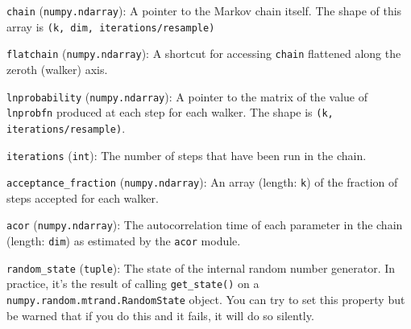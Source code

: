 \documentclass[12pt,preprint]{aastex}
\newlength{\argmarg}
\newcommand{\code}[1]{\texttt{#1}}
\newcommand{\param}[3]{{\item {\code{#1}} {\footnotesize (\code{#2})}: #3}}
\newcommand{\property}[3]{\param{#1}{#2}{#3}}
\newenvironment{arglist}[1]{\noindent\hspace{0.5\argmarg}{\bf {#1}}
    \begin{list}{}{
        \setlength{\leftmargin}{\argmarg}
    }}
    {\end{list}}
\newenvironment{properties}{\begin{arglist}{Properties}}{\end{arglist}}
\begin{document}
\begin{properties}
    \property{chain}{numpy.ndarray}{A pointer to the Markov chain itself. The
        shape of this array is \code{(k, dim, iterations/resample)}}
    \property{flatchain}{numpy.ndarray}{A shortcut for accessing \code{chain}
        flattened along the zeroth (walker) axis.}
    \property{lnprobability}{numpy.ndarray}{A pointer to the matrix of the
        value of \code{lnprobfn} produced at each step for each walker. The
        shape is \code{(k, iterations/resample)}.}
    \property{iterations}{int}{The number of steps that have been run in the
        chain.}
    \property{acceptance\_fraction}{numpy.ndarray}{An array (length: \code{k})
        of the fraction of steps accepted for each walker.}
    \property{acor}{numpy.ndarray}{The autocorrelation time of each parameter
        in the chain (length: \code{dim}) as estimated by the \code{acor}
        module.}
    \property{random\_state}{tuple}{The state of the internal random number
        generator. In practice, it's the result of calling \code{get\_state()}
        on a \code{numpy.random.mtrand.RandomState} object. You can try to
        set this property but be warned that if you do this and it fails, it
        will do so silently.}
\end{properties}
\end{document}
